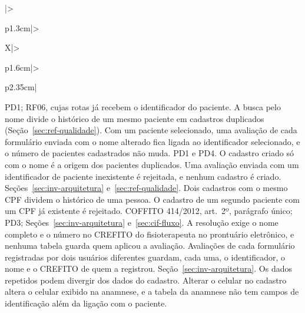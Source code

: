 \begin{apendicesenv}
{\begin{xltabular}{\textwidth}{|>{\raggedright\arraybackslash}p{1.3cm}|>{\raggedright\arraybackslash}X|>{\raggedright\arraybackslash}p{1.6cm}|>{\raggedright\arraybackslash}p{2.35cm}|}
		{PD1; RF06, cujas rotas já recebem o identificador do paciente.}
		{A busca pelo nome divide o histórico de um mesmo paciente em cadastros duplicados
		(Seção~\ref{sec:ref-qualidade}).}
		{Com um paciente selecionado, uma avaliação de cada formulário enviada com o nome alterado fica ligada ao
		identificador selecionado, e o número de pacientes cadastrados não muda.}
		{PD1 e PD4.}
		{O cadastro criado só com o nome é a origem dos pacientes duplicados.}
		{Uma avaliação enviada com um identificador de paciente inexistente é rejeitada, e nenhum cadastro é criado.}
		{Seções~\ref{sec:inv-arquitetura} e~\ref{sec:ref-qualidade}.}
		{Dois cadastros com o mesmo CPF dividem o histórico de uma pessoa.}
		{O cadastro de um segundo paciente com um CPF já existente é rejeitado.}
		{COFFITO 414/2012, art.~2º, parágrafo único; PD3; Seções~\ref{sec:inv-arquitetura} e~\ref{sec:cif-fluxo}.}
		{A resolução exige o nome completo e o número no CREFITO do fisioterapeuta no prontuário eletrônico, e nenhuma
		tabela guarda quem aplicou a avaliação.}
		{Avaliações de cada formulário registradas por dois usuários diferentes guardam, cada uma, o identificador, o
		nome e o CREFITO de quem a registrou.}
		{Seção~\ref{sec:inv-arquitetura}.}
		{Os dados repetidos podem divergir dos dados do cadastro.}
		{Alterar o celular no cadastro altera o celular exibido na anamnese, e a tabela da anamnese não tem campos de
		identificação além da ligação com o paciente.}


\end{xltabular}}
\end{apendicesenv}
